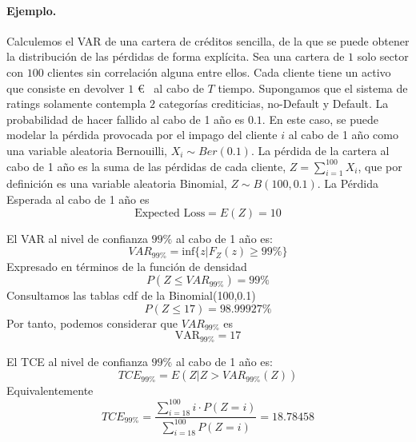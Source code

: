 \paragraph{Ejemplo.} Calculemos el VAR de una cartera de cr\'editos
sencilla, de la que se puede obtener la distribuci\'on de las p\'erdidas de
forma expl\'icita. Sea una cartera de $1$ solo sector con $100$ clientes sin
correlaci\'on alguna entre ellos. Cada cliente tiene un activo que consiste en
devolver $1$ \euro~ al cabo de $T$ tiempo. Supongamos que el sistema de ratings
solamente contempla $2$ categor\'ias crediticias, no-Default y Default. La
probabilidad de hacer fallido al cabo de 1 a\~no es $0.1$.
\newline
\newline
En este caso, se puede modelar la p\'erdida provocada por el impago del cliente
$i$ al cabo de 1 a\~no como una variable aleatoria Bernouilli, $X_i \sim Ber(0.1)$.
La p\'erdida de la cartera al cabo de 1 a\~no es la suma de las p\'erdidas de
cada cliente, $Z = \sum_{i=1}^{100} X_i$, que por definici\'on es una
variable aleatoria Binomial, $Z \sim B(100,0.1)$.
\newline
\newline
La P\'erdida Esperada al cabo de 1 a\~no es
\begin{displaymath}
\textrm{Expected Loss} = E(Z) = 10
\end{displaymath}

El VAR al nivel de confianza $99\%$ al cabo de 1 a\~no es:
\begin{displaymath}
VAR_{99\%} = \textrm{inf}\{z | F_Z(z) \geq 99\%\}
\end{displaymath}
Expresado en t\'erminos de la funci\'on de densidad
\begin{displaymath}
P(Z \leq VAR_{99\%}) = 99\%
\end{displaymath}
Consultamos las tablas cdf de la Binomial(100,0.1)
\begin{displaymath}
P(Z \leq 17) = 98.99927\%
\end{displaymath}
Por tanto, podemos considerar que $VAR_{99\%}$ es
\begin{displaymath}
\textrm{VAR}_{99\%} = 17
\end{displaymath}

El TCE al nivel de confianza $99\%$ al cabo de 1 a\~no es:
\begin{displaymath}
TCE_{99\%} = E(Z | Z > VAR_{99\%}(Z))
\end{displaymath}
Equivalentemente
\begin{displaymath}
TCE_{99\%} = \frac{\sum_{i=18}^{100} i\cdot P(Z=i)}{\sum_{i=18}^{100} P(Z=i)} = 18.78458
\end{displaymath}

